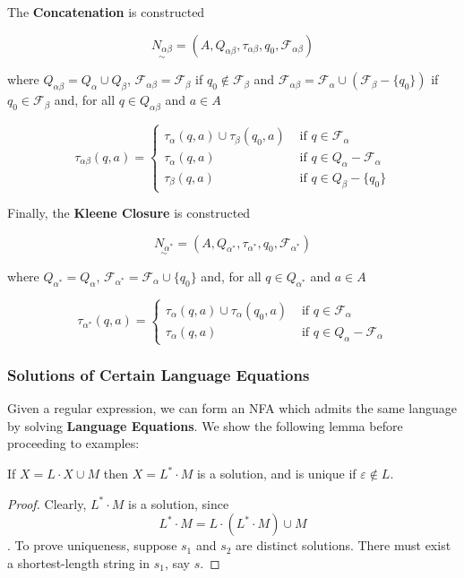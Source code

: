 The \textbf{Concatenation} is constructed 

\[\underset{\sim}{N_{\alpha\beta}}=(A, Q_{\alpha\beta}, \tau_{\alpha\beta}, q_0, \mathcal{F}_{\alpha\beta})\] 

where $Q_{\alpha\beta}=Q_{\alpha}\cup Q_{\beta}$, $\mathcal{F}_{\alpha\beta}=\mathcal{F}_{\beta}$ if $q_0\not\in \mathcal{F}_{\beta}$ and $\mathcal{F}_{\alpha\beta}=\mathcal{F}_{\alpha}\cup(\mathcal{F}_{\beta}-\{q_0\})$ if $q_0\in \mathcal{F}_{\beta}$ and, for all $q\in Q_{\alpha\beta}$ and $a\in A$

\[\tau_{\alpha\beta}(q, a) = \begin{cases}
      \tau_{\alpha}(q, a)\cup\tau_{\beta}(q_0, a) & \text{ if } q\in\mathcal{F}_{\alpha}\\
      \tau_{\alpha}(q, a) & \text{ if } q\in Q_{\alpha}-\mathcal{F}_{\alpha}\\
      \tau_{\beta}(q, a) & \text{ if } q\in Q_{\beta}-\{q_0\} 
\end{cases}\]

Finally, the \textbf{Kleene Closure} is constructed 

\[\underset{\sim}{N_{\alpha^*}}=(A, Q_{\alpha^*}, \tau_{\alpha^*}, q_0, \mathcal{F}_{\alpha^*})\] 

where $Q_{\alpha^*}=Q_{\alpha}$, $\mathcal{F}_{\alpha^*}=\mathcal{F}_{\alpha}\cup\{q_0\}$ and, for all $q\in Q_{\alpha^*}$ and $a\in A$

\[\tau_{\alpha^*}(q, a) = \begin{cases}
      \tau_{\alpha}(q, a)\cup\tau_{\alpha}(q_0, a) & \text{ if } q\in\mathcal{F}_{\alpha}\\
      \tau_{\alpha}(q, a) & \text{ if } q\in Q_{\alpha}-\mathcal{F}_{\alpha}
\end{cases}\]

\subsubsection{Solutions of Certain Language Equations}

Given a regular expression, we can form an NFA which admits the same language by solving \textbf{Language Equations}. We show the following lemma before proceeding to examples:

\begin{lemma}
      If $X=L\cdot X\cup M$ then $X=L^*\cdot M$ is a solution, and is unique if $\varepsilon\not\in L$. 
\end{lemma}

\begin{proof}
      Clearly, $L^*\cdot M$ is a solution, since \[L^*\cdot M = L\cdot (L^*\cdot M)\cup M\]. To prove uniqueness, suppose $s_1$ and $s_2$ are distinct solutions. There must exist a shortest-length string in $s_1$, say $s$. 
\end{proof}

